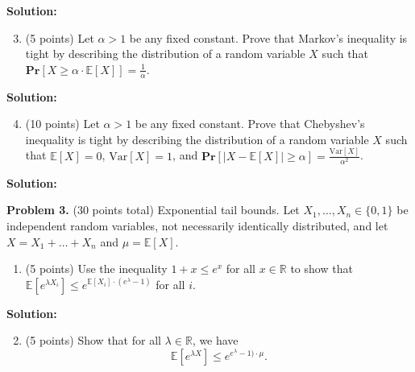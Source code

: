 \documentclass[11pt]{article}
\newcommand{\Ex}[1]{\ensuremath{\mathbb{E}\left[#1\right]}}
\newcommand{\Var}[1]{\ensuremath{\text{Var}\left[#1\right]}}
\newcommand{\PPr}[1]{\ensuremath{\mathbf{Pr}\left[#1\right]}}
\begin{document}
\noindent\textbf{Solution:}




\begin{enumerate}
\setcounter{enumi}{2}
\item (5 points)
Let $\alpha>1$ be any fixed constant. 
Prove that Markov's inequality is tight by describing the distribution of a random variable $X$ such that $\PPr{X\ge\alpha\cdot\Ex{X}}=\frac{1}{\alpha}$. 
\end{enumerate}

\noindent\textbf{Solution:}





\begin{enumerate}
\setcounter{enumi}{3}
\item (10 points)
Let $\alpha>1$ be any fixed constant. 
Prove that Chebyshev's inequality is tight by describing the distribution of a random variable $X$ such that $\Ex{X}=0$, $\Var{X}=1$, and $\PPr{|X-\Ex{X}|\ge\alpha}=\frac{\Var{X}}{\alpha^2}$. 
\end{enumerate}

\noindent\textbf{Solution:}










\newpage\noindent
\textbf{Problem 3.} (30 points total)
Exponential tail bounds.
\vskip 0.1in\noindent
Let $X_1,\ldots,X_n\in\{0,1\}$ be independent random variables, not necessarily identically distributed, and let $X=X_1+\ldots+X_n$ and $\mu=\Ex{X}$. 
\begin{enumerate}
\item (5 points)
Use the inequality $1+x\le e^x$ for all $x\in\mathbb{R}$ to show that $\Ex{e^{\lambda X_i}}\le e^{\Ex{X_i}\cdot(e^\lambda-1)}$ for all $i$. 
\end{enumerate}

\noindent\textbf{Solution:}

\begin{enumerate}
\setcounter{enumi}{1}
\item (5 points)
Show that for all $\lambda\in\mathbb{R}$, we have 
\[\Ex{e^{\lambda X}}\le e^{e^\lambda-1)\cdot\mu}.\]
\end{enumerate}
\end{document}
